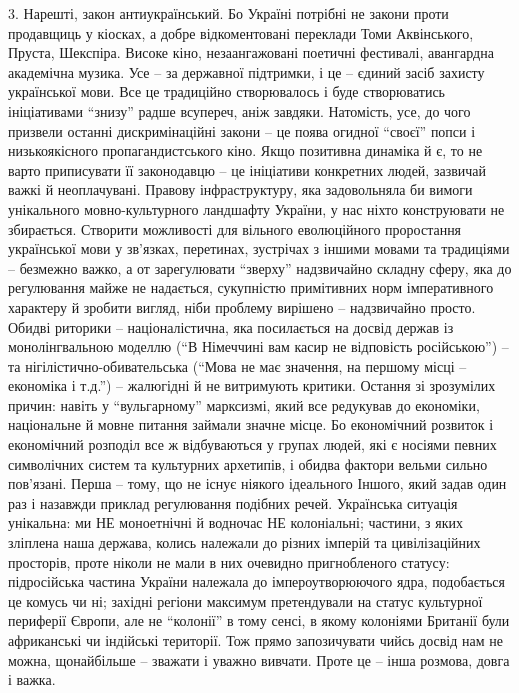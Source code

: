 3. Нарешті, закон антиукраїнський. Бо Україні потрібні не закони проти
продавщиць у кіосках, а добре відкоментовані переклади Томи Аквінського,
Пруста, Шекспіра. Високе кіно, незаангажовані поетичні фестивалі, авангардна
академічна музика. Усе – за державної підтримки, і це – єдиний засіб захисту
української мови.  Все це традиційно створювалось і буде створюватись
ініціативами \enquote{знизу} радше всупереч, аніж завдяки. Натомість, усе, до чого
призвели останні дискримінаційні закони – це поява огидної \enquote{своєї} попси і
низькоякісного пропагандистського кіно. Якщо позитивна динаміка й є, то не
варто приписувати її законодавцю – це ініціативи конкретних людей, зазвичай
важкі й неоплачувані. Правову інфраструктуру, яка задовольняла би вимоги
унікального мовно-культурного ландшафту України, у нас ніхто конструювати не
збирається. Створити можливості для вільного еволюційного проростання
української мови у зв'язках, перетинах, зустрічах з іншими мовами та традиціями
– безмежно важко, а от зарегулювати \enquote{зверху} надзвичайно складну сферу, яка до
регулювання майже не надається, сукупністю примітивних норм імперативного
характеру й зробити вигляд, ніби проблему вирішено – надзвичайно просто. Обидві
риторики – націоналістична, яка посилається на досвід держав із монолінгвальною
моделлю (\enquote{В Німеччині вам касир не відповість російською}) – та
нігілістично-обивательська (\enquote{Мова не має значення, на першому місці – економіка
і т.д.}) – жалюгідні й не витримують критики. Остання зі зрозумілих причин:
навіть у \enquote{вульгарному} марксизмі, який все редукував до економіки, національне
й мовне питання займали значне місце. Бо економічний розвиток і економічний
розподіл все ж відбуваються у групах людей, які є носіями певних символічних
систем та культурних архетипів, і обидва фактори вельми сильно пов'язані. Перша
– тому, що не існує ніякого ідеального Іншого, який задав один раз і назавжди
приклад регулювання подібних речей. Українська ситуація унікальна: ми НЕ
моноетнічні й водночас НЕ колоніальні; частини, з яких зліплена наша держава,
колись належали до різних імперій та цивілізаційних просторів, проте ніколи не
мали в них очевидно пригнобленого статусу: підросійська частина України
належала до імпероутворюючого ядра, подобається це комусь чи ні; західні
регіони максимум претендували на статус культурної периферії Європи, але не
\enquote{колонії} в тому сенсі, в якому колоніями Британії були африканські чи
індійські території. Тож прямо запозичувати чийсь досвід нам не можна,
щонайбільше – зважати і уважно вивчати. Проте це – інша розмова, довга і важка.

